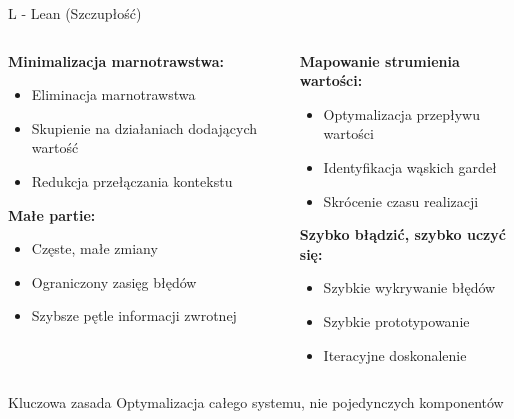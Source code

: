 \documentclass[10pt, aspectratio=169]{beamer}
\begin{document}
\begin{frame}{L - Lean (Szczupłość)}
\begin{columns}[T]
\begin{column}{0.5\textwidth}
\textbf{Minimalizacja marnotrawstwa:}
\begin{itemize}
\item Eliminacja marnotrawstwa
\item Skupienie na działaniach dodających wartość
\item Redukcja przełączania kontekstu
\end{itemize}

\textbf{Małe partie:}
\begin{itemize}
\item Częste, małe zmiany
\item Ograniczony zasięg błędów
\item Szybsze pętle informacji zwrotnej
\end{itemize}
\end{column}
\begin{column}{0.5\textwidth}
\textbf{Mapowanie strumienia wartości:}
\begin{itemize}
\item Optymalizacja przepływu wartości
\item Identyfikacja wąskich gardeł
\item Skrócenie czasu realizacji
\end{itemize}

\textbf{Szybko błądzić, szybko uczyć się:}
\begin{itemize}
\item Szybkie wykrywanie błędów
\item Szybkie prototypowanie
\item Iteracyjne doskonalenie
\end{itemize}
\end{column}
\end{columns}

\begin{block}{Kluczowa zasada}
Optymalizacja całego systemu, nie pojedynczych komponentów
\end{block}
\end{frame}
\end{document}
